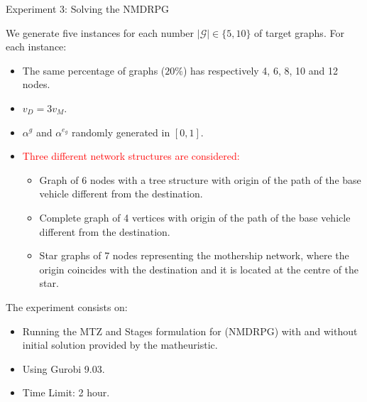\documentclass[slidestop,usepdftitle=false,10pt]{beamer}
\begin{document}
	
	\begin{frame}{Experiment 3: Solving the NMDRPG}
	    \begin{scriptsize}
        We generate five instances for each number $|\mathcal G|\in\{5, 10\}$ of target graphs. For each instance:
        \begin{itemize}
            \item The same percentage of graphs ($20\%$) has respectively 4, 6, 8, 10 and 12 nodes.
            \item $v_D= 3v_M$.
            \item $\alpha^g$ and $\alpha^{e_g}$ randomly generated in $[0, 1]$.
            \item \textcolor{red}{Three different network structures are considered:}
                {\color{red}
                \begin{scriptsize}
                \begin{itemize}
                    \item Graph of 6 nodes with a tree structure with origin of the path of the base vehicle different from the destination.
                    \item Complete graph of 4 vertices with origin of the path of the base vehicle different from the destination.
                    \item Star graphs of 7 nodes representing the mothership network, where the origin coincides with the destination and it is located at the centre of the star.
                \end{itemize}
                \end{scriptsize}}
        \end{itemize}
        
        The experiment consists on:
        \begin{itemize}
            \item Running the MTZ and Stages formulation for (NMDRPG) with and without initial solution provided by the matheuristic.
            \item Using Gurobi 9.03.
            \item Time Limit: 2 hour.
        \end{itemize}
	    
	\end{scriptsize} 
	\end{frame}
	
\end{document}
